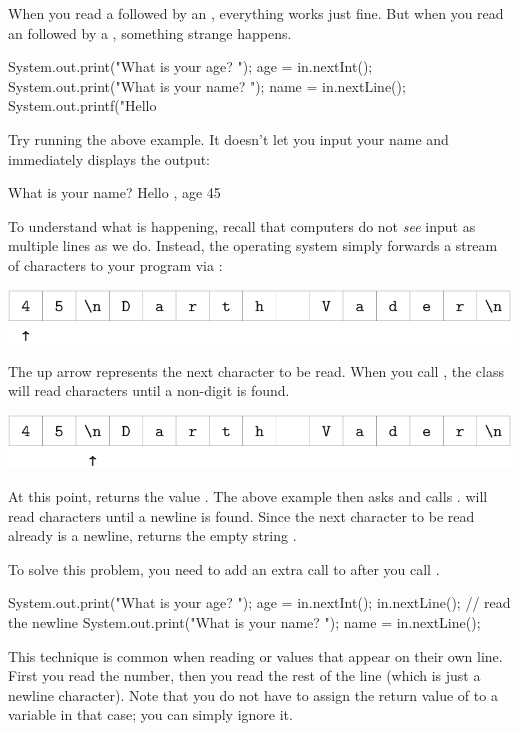 When you read a  followed by an , everything works just fine.
But when you read an  followed by a , something strange happens.

\begin{code}
    System.out.print("What is your age? ");
    age = in.nextInt();
    System.out.print("What is your name? ");
    name = in.nextLine();
    System.out.printf("Hello %
\end{code}

Try running the above example.
It doesn't let you input your name and immediately displays the output:

\begin{stdout}
    What is your name? Hello , age 45
\end{stdout}

To understand what is happening, recall that computers do not {\em see} input as multiple lines as we do.
Instead, the operating system simply forwards a stream of characters to your program via :

\begin{center}
\includegraphics{vader1.pdf}
\end{center}

The up arrow represents the next character to be read.
When you call , the  class will read characters until a non-digit is found.

\begin{center}
\includegraphics{vader2.pdf}
\end{center}

At this point,  returns the value .
The above example then asks  and calls .
 will read characters until a newline is found.
Since the next character to be read already is a newline,  returns the empty string .

To solve this problem, you need to add an extra call to  after you call .

\begin{code}
    System.out.print("What is your age? ");
    age = in.nextInt();
    in.nextLine();  // read the newline
    System.out.print("What is your name? ");
    name = in.nextLine();
\end{code}

This technique is common when reading  or  values that appear on their own line.
First you read the number, then you read the rest of the line (which is just a newline character).
Note that you do not have to assign the return value of  to a variable in that case; you can simply ignore it.
